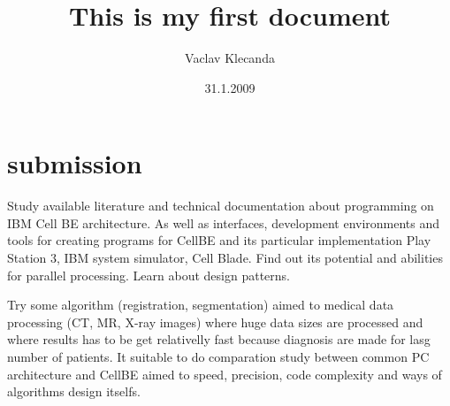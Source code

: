 \documentclass{article}
\title{This is my first document}
\author{Vaclav Klecanda}
\date{31.1.2009}
\begin{document}
\section*{submission}
Study available literature and technical documentation about programming on IBM Cell BE architecture. As well as interfaces, development environments and tools for creating programs for CellBE and its particular implementation Play Station 3, IBM system simulator, Cell Blade. Find out its potential and abilities for parallel processing. Learn about design patterns.

Try some algorithm (registration, segmentation) aimed to medical data processing (CT, MR, X-ray images) where huge data sizes are processed and where results has to be get relativelly fast because diagnosis are made for lasg number of patients. It suitable to do comparation study between common PC architecture and CellBE aimed to speed, precision, code complexity and ways of algorithms design itselfs.







\end{document}
